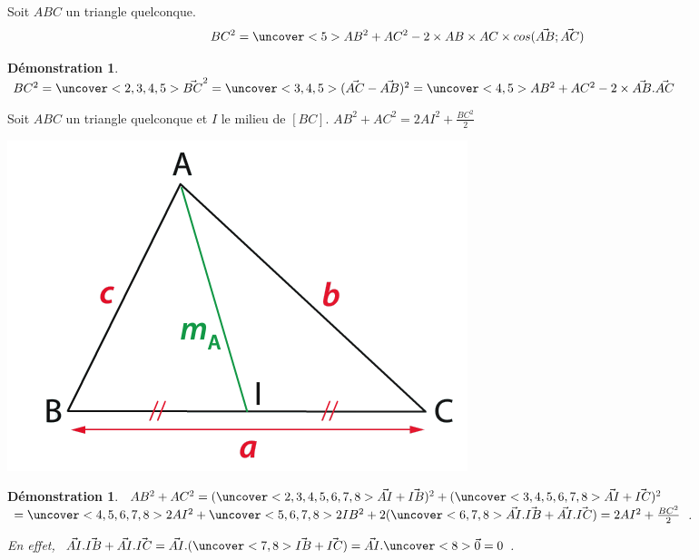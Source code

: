 \documentclass{beamer}
\theoremstyle{plain}
\newtheorem{demonstration}[theorem]{Démonstration}
\begin{document}
\begin{frame}
\begin{theorem}
 Soit $ABC$ un triangle quelconque. 
 $$BC^2=\uncover<5>{AB^2+AC^2-2 \times AB\times AC\times cos(\vec{AB};\vec{AC})}$$
 
\end{theorem}

\begin{demonstration}
 $BC^2=\uncover<2,3,4,5>{\vec{BC}^2}=
 \uncover<3,4,5>{(\vec{AC}-\vec{AB})^2}=\uncover<4,5>{AB^2+AC^2-2\times \vec{AB}.\vec{AC}}$
\end{demonstration}
\end{frame}


\begin{frame}
\begin{theorem}
 Soit $ABC$ un triangle quelconque et $I$ le milieu de $[BC]$. $AB^2+AC^2=2AI^2+\frac{BC^2}{2}$
 
   \begin{center}
    \includegraphics[scale=0.25]{../Images/mediane.png}
  \end{center}
\end{theorem}

\begin{demonstration}
 $AB^2+AC^2=(\uncover<2,3,4,5,6,7,8>{\vec{AI}+\vec{IB}})^2+(\uncover<3,4,5,6,7,8>{\vec{AI}+\vec{IC}})^2$
 $= \uncover<4,5,6,7,8>{2AI^2}+\uncover<5,6,7,8>{2IB^2}+
 2(\uncover<6,7,8>{\vec{AI}.\vec{IB}+\vec{AI}.\vec{IC}})=
 2AI^2+\frac{BC^2}{2}$. 
 
 En effet, $\vec{AI}.\vec{IB}+\vec{AI}.\vec{IC}=\vec{AI}.(\uncover<7,8>{\vec{IB}+\vec{IC}})=
 \vec{AI}.\uncover<8>{\vec{0}}=0$.
\end{demonstration}
\end{frame}
\end{document}

